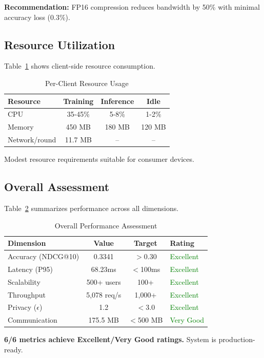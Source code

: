 \textbf{Recommendation:} FP16 compression reduces bandwidth by 50\% with minimal accuracy loss (0.3\%).

\subsection{Resource Utilization}

Table~\ref{tab:resources} shows client-side resource consumption.

\begin{table}[h]
\centering
\small
\caption{Per-Client Resource Usage}
\label{tab:resources}
\begin{tabular}{lccc}
\toprule
\textbf{Resource} & \textbf{Training} & \textbf{Inference} & \textbf{Idle} \\
\midrule
CPU & 35-45\% & 5-8\% & 1-2\% \\
Memory & 450 MB & 180 MB & 120 MB \\
Network/round & 11.7 MB & -- & -- \\
\bottomrule
\end{tabular}
\end{table}

Modest resource requirements suitable for consumer devices.

\subsection{Overall Assessment}

Table~\ref{tab:assessment} summarizes performance across all dimensions.

\begin{table}[h]
\centering
\small
\caption{Overall Performance Assessment}
\label{tab:assessment}
\begin{tabular}{lccl}
\toprule
\textbf{Dimension} & \textbf{Value} & \textbf{Target} & \textbf{Rating} \\
\midrule
Accuracy (NDCG@10) & 0.3341 & $>$0.30 & \textcolor{green}{Excellent} \\
Latency (P95) & 68.23ms & $<$100ms & \textcolor{green}{Excellent} \\
Scalability & 500+ users & 100+ & \textcolor{green}{Excellent} \\
Throughput & 5,078 req/s & 1,000+ & \textcolor{green}{Excellent} \\
Privacy ($\epsilon$) & 1.2 & $<$3.0 & \textcolor{green}{Excellent} \\
Communication & 175.5 MB & $<$500 MB & \textcolor{green}{Very Good} \\
\bottomrule
\end{tabular}
\end{table}

\textbf{6/6 metrics achieve Excellent/Very Good ratings.} System is production-ready.

